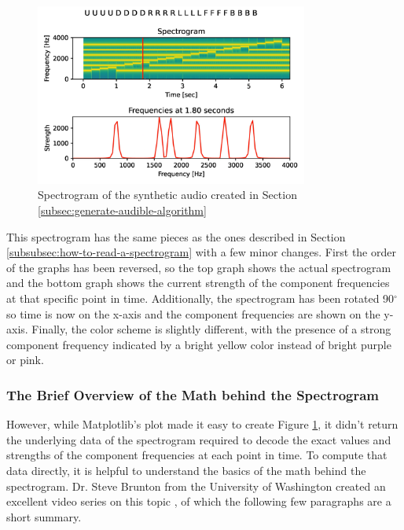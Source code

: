 \begin{figure}[h]
    \centering
    \caption{Spectrogram of the synthetic audio created in Section \ref{subsec:generate-audible-algorithm}}
    \label{fig:spectrogram}
    \includegraphics[width=0.8\textwidth]{Figures/5 Algorithm Design/component_frequencies.png}
\end{figure}

This spectrogram has the same pieces as the ones described in Section \ref{subsubsec:how-to-read-a-spectrogram} with a few minor changes.
First the order of the graphs has been reversed, so the top graph shows the actual spectrogram and the bottom graph shows the current strength of the component frequencies at that specific point in time.
Additionally, the spectrogram has been rotated 90$^\circ$ so time is now on the x-axis and the component frequencies are shown on the y-axis.
Finally, the color scheme is slightly different, with the presence of a strong component frequency indicated by a bright yellow color instead of bright purple or pink.

\subsubsection{The Brief Overview of the Math behind the Spectrogram}
However, while Matplotlib's  plot \cite{matplotlib} made it easy to create Figure \ref{fig:spectrogram}, it didn't return the underlying data of the spectrogram required to decode the exact values and strengths of the component frequencies at each point in time.
To compute that data directly, it is helpful to understand the basics of the math behind the spectrogram. Dr. Steve Brunton from the University of Washington created an excellent video series on this topic \cite{fourier-analysis}, of which the following few paragraphs are a short summary.


